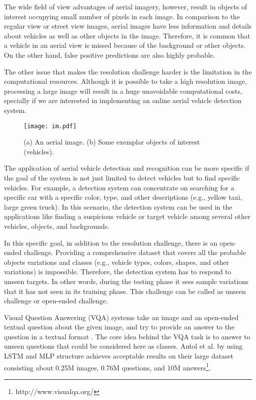 \documentclass[conference]{IEEEtran}
\begin{document}
The wide field of view advantages of aerial imagery, however, result in objects of interest occupying small number of pixels in each image. In comparison to the regular view or street view images, aerial images have less information and details about vehicles as well as other objects in the image. Therefore, it is common that a vehicle in an aerial view is missed because of the background or other objects. On the other hand, false positive predictions are also highly probable.

The other issue that makes the resolution challenge harder is the limitation in the computational resources. Although it is possible to take a high resolution image, processing a large image will result in a huge unavoidable computational costs, specially if we are interested in implementing an online aerial vehicle detection system.
\begin{figure}[!t]
\centering
\texttt{[image: im.pdf]}\\
\caption{(a) An aerial image. (b) Some exemplar objects of interest (vehicles).}
\label{fig_graph2}
\end{figure}

The application of aerial vehicle detection and recognition can be more specific if the goal of the system is not just limited to detect vehicles but to find specific vehicles. For example, a detection system can concentrate on searching for a specific car with a specific color, type, and other descriptions (e.g., yellow taxi, large green truck). In this scenario, the detection system can be used in the applications like finding a suspicious vehicle or target vehicle among several other vehicles, objects, and backgrounds.

In this specific goal, in addition to the resolution challenge, there is an open-ended challenge. Providing a comprehensive dataset that covers all the probable objects variations and classes (e.g., vehicle types, colors, shapes, and other variations) is impossible. Therefore, the detection system has to respond to unseen targets. In other words, during the testing phase it sees sample variations that it has not seen in its training phase. This challenge can be called as unseen challenge or open-ended challenge.


Visual Question Answering (VQA) systems take an image and an open-ended textual question about the given image, and try to provide an answer to the question in a textual format \cite{vqapaper}. The core idea behind the VQA task is to answer to unseen questions that could be considered here as classes. Antol et al. by using LSTM and MLP structure achieves acceptable results on their large dataset consisting about 0.25M images, 0.76M questions, and 10M answers\footnote{http://www.visualqa.org/}.
\end{document}
